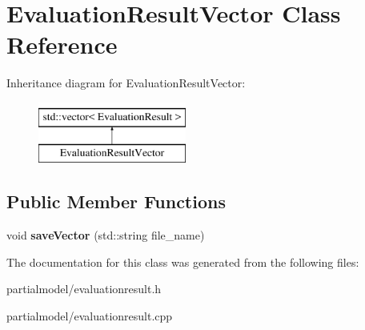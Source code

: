 \hypertarget{classEvaluationResultVector}{}\section{Evaluation\+Result\+Vector Class Reference}
\label{classEvaluationResultVector}
Inheritance diagram for Evaluation\+Result\+Vector\+:\begin{figure}[H]
\begin{center}
\leavevmode
\includegraphics[height=2.000000cm]{classEvaluationResultVector}
\end{center}
\end{figure}
\subsection*{Public Member Functions}
\begin{DoxyCompactItemize}
\item 
void {\bfseries save\+Vector} (std\+::string file\+\_\+name)\hypertarget{classEvaluationResultVector_a5f4b52d9b54b911a77505b168fe16aba}{}\label{classEvaluationResultVector_a5f4b52d9b54b911a77505b168fe16aba}

\end{DoxyCompactItemize}


The documentation for this class was generated from the following files\+:\begin{DoxyCompactItemize}
\item 
partialmodel/evaluationresult.\+h\item 
partialmodel/evaluationresult.\+cpp\end{DoxyCompactItemize}
